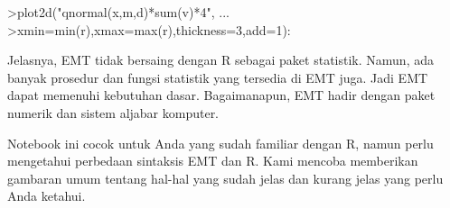 \documentclass[a4paper,10pt]{article}
\begin{document}
\begin{eulernotebook}
\begin{eulercomment}
\begin{eulercomment}
\begin{eulercomment}
\begin{eulercomment}
\begin{eulercomment}
\begin{eulercomment}
\begin{eulercomment}
\end{eulercomment}
\begin{eulerprompt}
>plot2d("qnormal(x,m,d)*sum(v)*4", ...
>xmin=min(r),xmax=max(r),thickness=3,add=1):
\end{eulerprompt}
\begin{eulercomment}
\begin{eulercomment}
\begin{eulercomment}
Jelasnya, EMT tidak bersaing dengan R sebagai paket statistik. Namun,
ada banyak prosedur dan fungsi statistik yang tersedia di EMT juga.
Jadi EMT dapat memenuhi kebutuhan dasar. Bagaimanapun, EMT hadir
dengan paket numerik dan sistem aljabar komputer.

Notebook ini cocok untuk Anda yang sudah familiar dengan R, namun
perlu mengetahui perbedaan sintaksis EMT dan R. Kami mencoba
memberikan gambaran umum tentang hal-hal yang sudah jelas dan kurang
jelas yang perlu Anda ketahui.


\end{eulercomment}
\end{eulercomment}
\end{eulercomment}
\end{eulercomment}
\end{eulercomment}
\end{eulercomment}
\end{eulercomment}
\end{eulercomment}
\end{eulercomment}
\end{eulernotebook}
\end{document}
